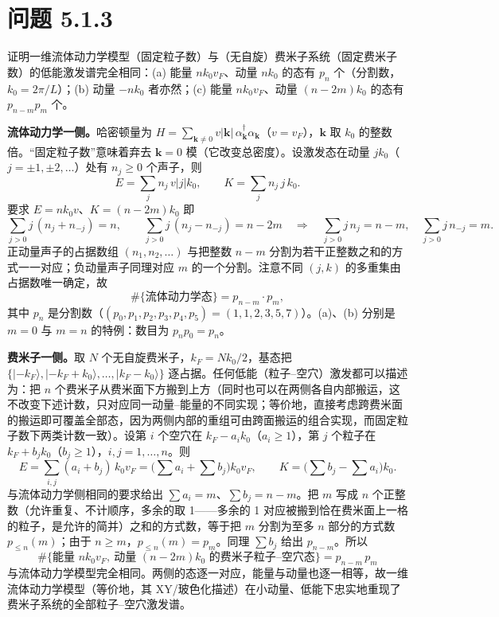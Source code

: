 \section*{问题 5.1.3}
\begin{problem}
证明一维流体动力学模型（固定粒子数）与（无自旋）费米子系统（固定费米子数）的低能激发谱完全相同：(a) 能量 $nk_0v_F$、动量 $nk_0$ 的态有 $p_n$ 个（分割数，$k_0=2\pi/L$）；(b) 动量 $-nk_0$ 者亦然；(c) 能量 $nk_0v_F$、动量 $(n-2m)k_0$ 的态有 $p_{n-m}p_m$ 个。
\end{problem}
\solution

\textbf{流体动力学一侧。}哈密顿量为 $H=\sum_{\pmb{k}\neq0}v|\pmb{k}|\,\alpha_{\pmb{k}}^{\dagger}\alpha_{\pmb{k}}$（$v=v_F$），$\pmb{k}$ 取 $k_0$ 的整数倍。“固定粒子数”意味着弃去 $\pmb{k}=0$ 模（它改变总密度）。设激发态在动量 $jk_0$（$j=\pm1,\pm2,\dots$）处有 $n_j\geq0$ 个声子，则
\begin{equation*}
E=\sum_j n_j\,v|j|k_0,\qquad K=\sum_j n_j\,j\,k_0 .
\end{equation*}
要求 $E=nk_0v$、$K=(n-2m)k_0$ 即
\begin{equation*}
\sum_{j>0}j\,(n_j+n_{-j})=n,\qquad
\sum_{j>0}j\,(n_j-n_{-j})=n-2m
\quad\Longrightarrow\quad
\sum_{j>0}j\,n_j=n-m,\quad \sum_{j>0}j\,n_{-j}=m .
\end{equation*}
正动量声子的占据数组 $(n_1,n_2,\dots)$ 与把整数 $n-m$ 分割为若干正整数之和的方式一一对应；负动量声子同理对应 $m$ 的一个分割。注意不同 $(j,k)$ 的多重集由占据数唯一确定，故
\begin{equation*}
\#\{\text{流体动力学态}\}=p_{n-m}\cdot p_m ,
\end{equation*}
其中 $p_n$ 是分割数（$(p_0,p_1,p_2,p_3,p_4,p_5)=(1,1,2,3,5,7)$）。(a)、(b) 分别是 $m=0$ 与 $m=n$ 的特例：数目为 $p_np_0=p_n$。

\textbf{费米子一侧。}取 $N$ 个无自旋费米子，$k_F=Nk_0/2$，基态把 $\{|-k_F\rangle,|{-k_F+k_0}\rangle,\dots,|k_F-k_0\rangle\}$ 逐占据。任何低能（粒子--空穴）激发都可以描述为：把 $n$ 个费米子从费米面下方搬到上方（同时也可以在两侧各自内部搬运，这不改变下述计数，只对应同一动量--能量的不同实现；等价地，直接考虑跨费米面的搬运即可覆盖全部态，因为两侧内部的重组可由跨面搬运的组合实现，而固定粒子数下两类计数一致）。设第 $i$ 个空穴在 $k_F-a_ik_0$（$a_i\geq1$），第 $j$ 个粒子在 $k_F+b_jk_0$（$b_j\geq1$），$i,j=1,\dots,n$。则
\begin{equation*}
E=\sum_{i,j}(a_i+b_j)\,k_0v_F=\Big(\sum a_i+\sum b_j\Big)k_0v_F,\qquad
K=\Big(\sum b_j-\sum a_i\Big)k_0 .
\end{equation*}
与流体动力学侧相同的要求给出 $\sum a_i=m$、$\sum b_j=n-m$。把 $m$ 写成 $n$ 个正整数（允许重复、不计顺序，多余的取 1——多余的 1 对应被搬到恰在费米面上一格的粒子，是允许的简并）之和的方式数，等于把 $m$ 分割为至多 $n$ 部分的方式数 $p_{\leq n}(m)$；由于 $n\geq m$，$p_{\leq n}(m)=p_m$。同理 $\sum b_j$ 给出 $p_{n-m}$。所以
\begin{equation*}
\boxed{\;\#\{\text{能量 } nk_0v_F,\ \text{动量 }(n-2m)k_0\text{ 的费米子粒子--空穴态}\}=p_{n-m}\,p_m\;}
\end{equation*}
与流体动力学模型完全相同。两侧的态逐一对应，能量与动量也逐一相等，故一维流体动力学模型（等价地，其 XY/玻色化描述）在小动量、低能下忠实地重现了费米子系统的全部粒子--空穴激发谱。

